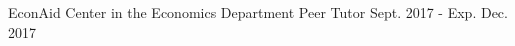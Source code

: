 

\begin{cventries}

  \cventry
    {EconAid Center in the Economics Department} %
    {Peer Tutor} %
    {}
    {Sept. 2017 - Exp. Dec. 2017} %
    {}
     


\end{cventries}
